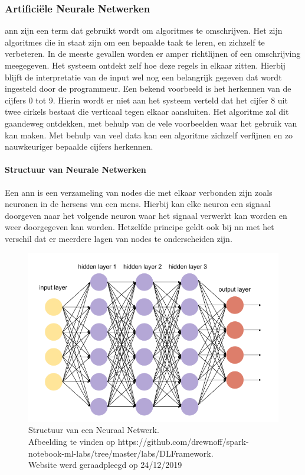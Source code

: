 		\subsubsection{Artifici\"ele Neurale Netwerken}
		\gls{ann} zijn een term dat gebruikt wordt om algoritmes te omschrijven. Het zijn algoritmes die in staat zijn om een bepaalde taak te leren, en zichzelf te verbeteren. In de meeste gevallen worden er amper richtlijnen of een omschrijving meegegeven. Het systeem ontdekt zelf hoe deze regels in elkaar zitten\cite{carbonell1983overview}. Hierbij blijft de interpretatie van de input wel nog een belangrijk gegeven dat wordt ingesteld door de programmeur. Een bekend voorbeeld is het herkennen van de cijfers 0 tot 9. Hierin wordt er niet aan het systeem verteld dat het cijfer 8 uit twee cirkels bestaat die verticaal tegen elkaar aansluiten. Het algoritme zal dit gaandeweg ontdekken, met behulp van de vele voorbeelden waar het gebruik van kan maken. Met behulp van veel data kan een algoritme zichzelf verfijnen en zo nauwkeuriger bepaalde cijfers herkennen.
		
			\paragraph{Structuur van Neurale Netwerken}
			Een \gls{ann} is een verzameling van nodes die met elkaar verbonden zijn zoals neuronen in de hersens van een mens. Hierbij kan elke neuron een signaal doorgeven naar het volgende neuron waar het signaal verwerkt kan worden en weer doorgegeven kan worden. Hetzelfde principe geldt ook bij \gls{nn} met het verschil dat er meerdere lagen van nodes te onderscheiden zijn. 
	
		\begin{figure}
			\centering
			\includegraphics[width=140mm]{afbeeldingen/neuralNetwork3.PNG}
			\caption{Structuur van een Neuraal Netwerk. \\Afbeelding te vinden op https://github.com/drewnoff/spark-notebook-ml-labs/tree/master/labs/DLFramework.\\ Website werd geraadpleegd op 24/12/2019 }
			\label{fig:neuralNetworkStructuur}
		\end{figure}
		
